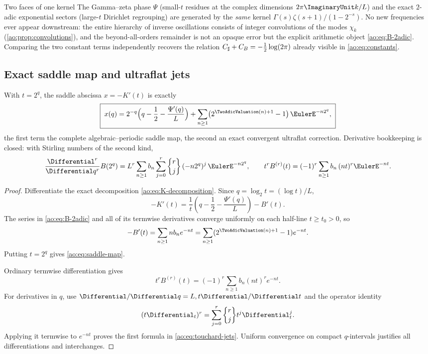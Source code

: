 \begin{statuspanel}{Two faces of one kernel}
The Gamma--zeta phase $\Psi$ (small-$t$ residues at the complex
dimensions $2\pi\ImaginaryUnit k/L$) and the exact $2$-adic exponential sectors
(large-$t$ Dirichlet regrouping) are generated by the \emph{same}
kernel $\Gamma(s)\zeta(s+1)/(1-2^{-s})$.  No new frequencies ever
appear downstream: the entire hierarchy of inverse oscillations
consists of integer convolutions of the modes
$\chi_k$ (\cref{ao:prop:convolutions}), and the beyond-all-orders
remainder is not an opaque error but the explicit arithmetic object
\eqref{ao:eq:B-2adic}.  Comparing the two constant terms independently
recovers the relation $C_{\sharp}+C_B=-\tfrac12\log(2\pi)$ already visible in
\eqref{ao:eq:constants}.
\end{statuspanel}

\subsection{Exact saddle map and ultraflat jets}

\begin{corollary}
\label{ao:cor:saddle-map}
With $t=2^{q}$, the saddle abscissa $x=-K'(t)$ is exactly
\begin{equation}
 \boxed{\;
 x(q)=2^{-q}\Bigl(q-\frac12-\frac{\Psi'(q)}{L}\Bigr)
 +\sum_{n\ge1}\bigl(2^{\TwoAdicValuation(n)+1}-1\bigr)\,\EulerE^{-n2^{q}},
 \;}
 \label{ao:eq:saddle-map}
\end{equation}
the first term the complete algebraic--periodic saddle map, the
second an exact convergent ultraflat correction.  Derivative
bookkeeping is closed: with Stirling numbers of the second kind,
\begin{equation}
 \frac{\Differential^{r}}{\Differential q^{r}}B(2^{q})
 =L^{r}\sum_{n\ge1}b_n
 \sum_{j=0}^{r}
 \genfrac\{\}{0pt}{}{r}{j}\,(-n2^{q})^{j}\,\EulerE^{-n2^{q}},
 \qquad
 t^{r}B^{(r)}(t)=(-1)^{r}\sum_{n\ge1}b_n\,(nt)^{r}\EulerE^{-nt}.
 \label{ao:eq:touchard-jets}
\end{equation}
\end{corollary}

\begin{proof}
Differentiate the exact decomposition \eqref{ao:eq:K-decomposition}.  Since
$q=\log_2t=(\log t)/L$,
\[
 -K'(t)=\frac1t\left(q-\frac12-\frac{\Psi'(q)}L\right)-B'(t).
\]
The series in \eqref{ao:eq:B-2adic} and all of its termwise derivatives
converge uniformly on each half-line $t\ge t_0>0$, so
\[
 -B'(t)=\sum_{n\ge1}n b_ne^{-nt}
 =\sum_{n\ge1}(2^{\TwoAdicValuation(n)+1}-1)e^{-nt}.
\]
Putting $t=2^q$ gives \eqref{ao:eq:saddle-map}.

Ordinary termwise differentiation gives
\[
 t^rB^{(r)}(t)=(-1)^r\sum_{n\ge1}b_n(nt)^re^{-nt}.
\]
For derivatives in $q$, use
$\Differential/\Differential q=L,t\Differential/\Differential t$ and the
operator identity
\[
 (t\Differential_t)^r
 =\sum_{j=0}^r\genfrac\{\}{0pt}{}{r}{j}t^j\Differential_t^j.
\]
Applying it termwise to $e^{-nt}$ proves the first formula in
\eqref{ao:eq:touchard-jets}.  Uniform convergence on compact $q$-intervals
justifies all differentiations and interchanges.
\end{proof}

